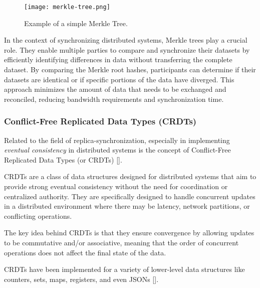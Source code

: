 \begin{figure}[h]
    \centering
    \texttt{[image: merkle-tree.png]}
    \caption{Example of a simple Merkle Tree.}
    \label{fig:merkle-tree}
\end{figure}

In the context of synchronizing distributed systems, Merkle trees play a crucial role. They enable multiple parties to compare and synchronize their datasets by efficiently identifying differences in data without transferring the complete dataset. By comparing the Merkle root hashes, participants can determine if their datasets are identical or if specific portions of the data have diverged. This approach minimizes the amount of data that needs to be exchanged and reconciled, reducing bandwidth requirements and synchronization time.

\subsubsection{Conflict-Free Replicated Data Types (CRDTs)}

Related to the field of replica-synchronization, especially in implementing \textit{eventual consistency} in distributed systems is the concept of Conflict-Free Replicated Data Types (or CRDTs) [\cite{crdts}].

CRDTs are a class of data structures designed for distributed systems that aim to provide strong eventual consistency without the need for coordination or centralized authority. They are specifically designed to handle concurrent updates in a distributed environment where there may be latency, network partitions, or conflicting operations.

The key idea behind CRDTs is that they ensure convergence by allowing updates to be commutative and/or associative, meaning that the order of concurrent operations does not affect the final state of the data.

CRDTs have been implemented for a variety of lower-level data structures like counters, sets, maps, registers, and even JSONs [\cite{json-crdt}].
